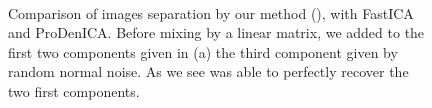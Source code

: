 \begin{figure}[t]
\begin{center}
\\
\end{center}
\caption{Comparison of images separation by our method (\ICA), with FastICA and ProDenICA. Before mixing by a linear matrix, we added to the first two components given in (a) the third component given by random
normal noise. As we see \ICA{} was able to perfectly recover the two first components.}
\label{fig:image_ICA_int}
\end{figure}

